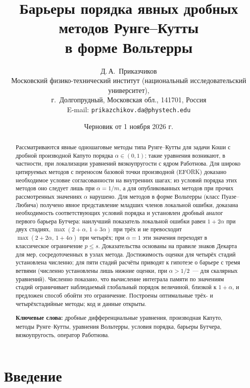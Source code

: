 \documentclass[11pt,a4paper]{article}
\title{Барьеры порядка явных дробных методов Рунге--Кутты\\ в форме Вольтерры}
\author{Д.\,А.~Приказчиков\\[2pt]
\small Московский физико-технический институт (национальный исследовательский университет),\\
\small г.~Долгопрудный, Московская обл., 141701, Россия\\
\small E-mail: \texttt{prikazchikov.da@phystech.edu}}
\date{Черновик от 1 ноября 2026 г.}
\theoremstyle{plain}
\theoremstyle{definition}
\begin{document}
\maketitle

\begin{abstract}
Рассматриваются явные одношаговые методы типа Рунге--Кутты для задачи Коши с дробной производной Капуто порядка $\alpha\in(0,1)$; такие уравнения возникают, в частности, при локализации уравнений вязкоупругости с ядром Работнова. Для широко цитируемых методов с переносом базовой точки производной (EFORK) доказано необходимое условие согласованности на внутренних шагах; из условий порядка этих методов оно следует лишь при $\alpha=1/m$, а для опубликованных методов при прочих рассмотренных значениях $\alpha$ нарушено. Для методов в форме Вольтерры (класс Пуазе--Любича) получено явное представление младших членов локальной ошибки, доказана необходимость соответствующих условий порядка и установлен дробный аналог первого барьера Бутчера: наилучший показатель локальной ошибки равен $1+2\alpha$ при двух стадиях, $\max(2+\alpha,\,1+3\alpha)$ при трёх и не превосходит $\max(2+2\alpha,\,1+4\alpha)$ при четырёх; при $\alpha=1$ эти значения переходят в классическое ограничение $p\le s$. Доказательства основаны на правиле знаков Декарта для мер, сосредоточенных в узлах метода. Достижимость оценки для четырёх стадий установлена численно; для пяти стадий расчёты приводят к гипотезе о барьере с тремя ветвями (численно установлены лишь нижние оценки, при $\alpha>1/2$~--- для скалярных уравнений). Численно показано, что вычисление интеграла памяти по значениям стадий ограничивает наблюдаемый глобальный порядок величиной, близкой к $1+\alpha$, и предложен способ обойти это ограничение. Построены оптимальные трёх- и четырёхстадийные методы; код и данные открыты.

\medskip\noindent\textbf{Ключевые слова:} дробные дифференциальные уравнения, производная Капуто, методы Рунге--Кутты, уравнения Вольтерры, условия порядка, барьеры Бутчера, вязкоупругость, оператор Работнова.
\end{abstract}

\section{Введение}
\end{document}
